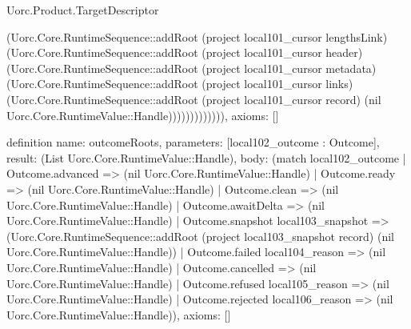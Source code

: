 \begin{lexlean}{Uorc.Product.TargetDescriptor}
\begin{semanticmodule}
{(Uorc.Core.RuntimeSequence::addRoot (project local101_cursor lengthsLink) (Uorc.Core.RuntimeSequence::addRoot (project local101_cursor header) (Uorc.Core.RuntimeSequence::addRoot (project local101_cursor metadata) (Uorc.Core.RuntimeSequence::addRoot (project local101_cursor links) (Uorc.Core.RuntimeSequence::addRoot (project local101_cursor record) (nil Uorc.Core.RuntimeValue::Handle))))))))))))),
  axioms: []
}

definition{
  name: outcomeRoots,
  parameters: [local102_outcome : Outcome],
  result: (List Uorc.Core.RuntimeValue::Handle),
  body: (match local102_outcome
    | Outcome.advanced => (nil Uorc.Core.RuntimeValue::Handle)
    | Outcome.ready => (nil Uorc.Core.RuntimeValue::Handle)
    | Outcome.clean => (nil Uorc.Core.RuntimeValue::Handle)
    | Outcome.awaitDelta => (nil Uorc.Core.RuntimeValue::Handle)
    | Outcome.snapshot local103_snapshot => (Uorc.Core.RuntimeSequence::addRoot (project local103_snapshot record) (nil Uorc.Core.RuntimeValue::Handle))
    | Outcome.failed local104_reason => (nil Uorc.Core.RuntimeValue::Handle)
    | Outcome.cancelled => (nil Uorc.Core.RuntimeValue::Handle)
    | Outcome.refused local105_reason => (nil Uorc.Core.RuntimeValue::Handle)
    | Outcome.rejected local106_reason => (nil Uorc.Core.RuntimeValue::Handle)),
  axioms: []
}


\end{semanticmodule}
\end{lexlean}
